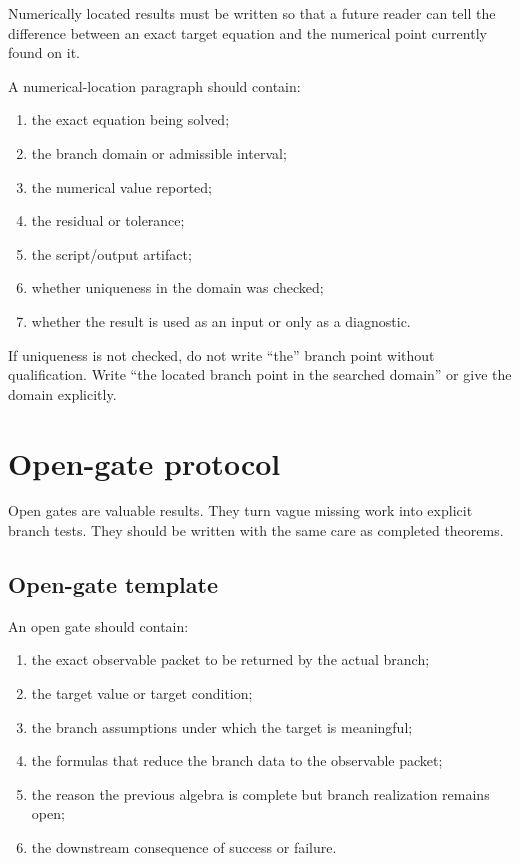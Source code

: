 Numerically located results must be written so that a future reader can tell the difference between an exact target equation and the numerical point currently found on it.

A numerical-location paragraph should contain:

\begin{enumerate}[leftmargin=2.0em]
\item the exact equation being solved;
\item the branch domain or admissible interval;
\item the numerical value reported;
\item the residual or tolerance;
\item the script/output artifact;
\item whether uniqueness in the domain was checked;
\item whether the result is used as an input or only as a diagnostic.
\end{enumerate}

If uniqueness is not checked, do not write ``the'' branch point without qualification.  Write ``the located branch point in the searched domain'' or give the domain explicitly.

\section{Open-gate protocol}
\label{sec:open-gate-protocol}

Open gates are valuable results.  They turn vague missing work into explicit branch tests.  They should be written with the same care as completed theorems.

\subsection{Open-gate template}
\label{subsec:open-gate-template}

An open gate should contain:

\begin{enumerate}[leftmargin=2.0em]
\item the exact observable packet to be returned by the actual branch;
\item the target value or target condition;
\item the branch assumptions under which the target is meaningful;
\item the formulas that reduce the branch data to the observable packet;
\item the reason the previous algebra is complete but branch realization remains open;
\item the downstream consequence of success or failure.
\end{enumerate}

